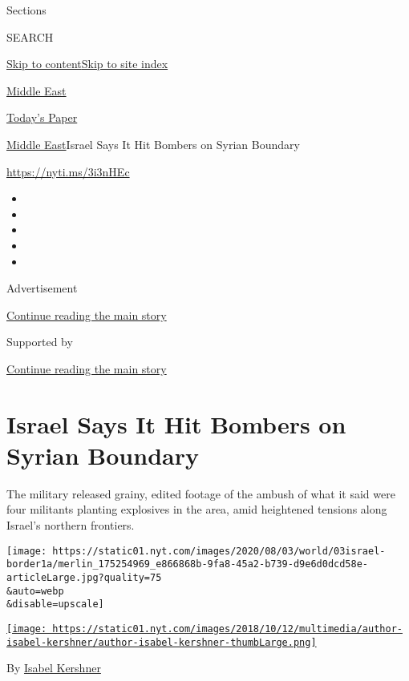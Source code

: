 Sections

SEARCH

\protect\hyperlink{site-content}{Skip to
content}\protect\hyperlink{site-index}{Skip to site index}

\href{https://www.nytimes.com/section/world/middleeast}{Middle East}

\href{https://myaccount.nytimes.com/auth/login?response_type=cookie\&client_id=vi}{}

\href{https://www.nytimes.com/section/todayspaper}{Today's Paper}

\href{/section/world/middleeast}{Middle East}\textbar{}Israel Says It
Hit Bombers on Syrian Boundary

\url{https://nyti.ms/3i3nHEc}

\begin{itemize}
\item
\item
\item
\item
\item
\end{itemize}

Advertisement

\protect\hyperlink{after-top}{Continue reading the main story}

Supported by

\protect\hyperlink{after-sponsor}{Continue reading the main story}

\hypertarget{israel-says-it-hit-bombers-on-syrian-boundary}{%
\section{Israel Says It Hit Bombers on Syrian
Boundary}\label{israel-says-it-hit-bombers-on-syrian-boundary}}

The military released grainy, edited footage of the ambush of what it
said were four militants planting explosives in the area, amid
heightened tensions along Israel's northern frontiers.

\texttt{[image: https://static01.nyt.com/images/2020/08/03/world/03israel-border1a/merlin\_175254969\_e866868b-9fa8-45a2-b739-d9e6d0dcd58e-articleLarge.jpg?quality=75\\\&auto=webp\\\&disable=upscale]}

\href{https://www.nytimes.com/by/isabel-kershner}{\texttt{[image: https://static01.nyt.com/images/2018/10/12/multimedia/author-isabel-kershner/author-isabel-kershner-thumbLarge.png]}}

By \href{https://www.nytimes.com/by/isabel-kershner}{Isabel Kershner}

